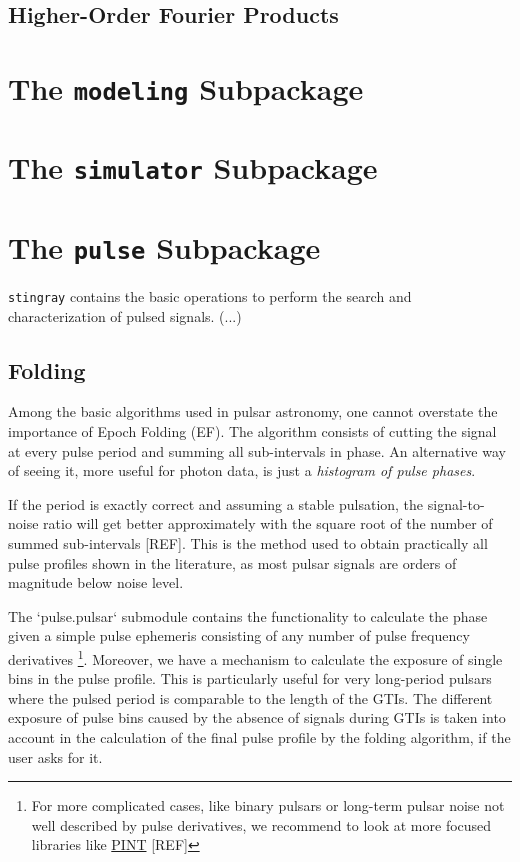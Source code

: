 \documentclass[12pt]{emulateapj}
\newcommand{\stingray}{\texttt{stingray}\xspace}
\begin{document}
\subsection{Higher-Order Fourier Products}
\label{sec:fourier_others}

\section{The \texttt{modeling} Subpackage}
\label{sec:modeling}

\section{The \texttt{simulator} Subpackage}
\label{sec:simulator}

\section{The \texttt{pulse} Subpackage}
\label{sec:pulsar}
\stingray contains the basic operations to perform the search and characterization of pulsed signals.
(...)
\subsection{Folding}
Among the basic algorithms used in pulsar astronomy, one cannot overstate the importance of Epoch Folding (EF).
The algorithm consists of cutting the signal at every pulse period and summing all sub-intervals in phase. 
An alternative way of seeing it, more useful for photon data, is just a \textit {histogram of pulse phases}.

If the period is exactly correct and assuming a stable pulsation, the signal-to-noise ratio will get better approximately with the square root of the number of summed sub-intervals [REF].
This is the method used to obtain practically all pulse profiles shown in the literature, as most pulsar signals are orders of magnitude below noise level.

The `pulse.pulsar` submodule contains the functionality to calculate the phase given a simple pulse ephemeris consisting of any number of pulse frequency derivatives%
\footnote{For more complicated cases, like binary pulsars or long-term pulsar noise not well described by pulse derivatives, we recommend to look at more focused libraries like \href{https://github.com/nanograv/PINT}{PINT} [REF]}.
Moreover, we have a mechanism to calculate the exposure of single bins in the pulse profile. 
This is particularly useful for very long-period pulsars where the pulsed period is comparable to the length of the GTIs.
The different exposure of pulse bins caused by the absence of signals during GTIs is taken into account in the calculation of the final pulse profile by the folding algorithm, if the user asks for it. 
\end{document}
